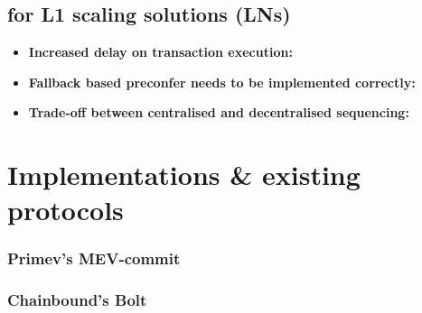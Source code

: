 \documentclass[a4paper]{article}
\theoremstyle{boldstyle}
\begin{document}
    \subsection{for L1 scaling solutions (LNs)}
    \begin{itemize}
        \item \textbf{Increased delay on transaction execution:} %
        
        \item \textbf{Fallback based preconfer needs to be implemented correctly:} %
        
        \item \textbf{Trade-off between centralised and decentralised sequencing:} %
    \end{itemize}


\section{Implementations \& existing protocols}

        \subsubsection{ \textbf{Primev's MEV-commit}}
        

        \subsubsection{ \textbf{Chainbound's Bolt}}
        
\end{document}
